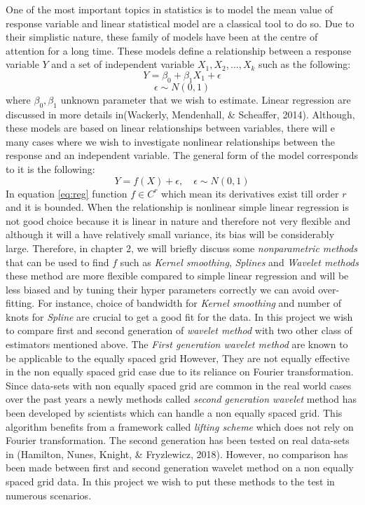 \documentclass[12pt,twoside, a4paper]{reedthesis}
\begin{document}
One of the most important topics in statistics is to model the mean value of response variable and linear statistical model are a classical tool to do so. Due to their simplistic nature, these family of models have been at the centre of attention for a long time. These models define a relationship between a response variable \(Y\) and a set of independent variable \(X_1,X_2,\dots,X_k\) such as the following:
\[Y=\beta_0+\beta_1X_1+\epsilon\]
\[\epsilon\sim N(0,1)\]
where \(\beta_0,\beta_1\) unknown parameter that we wish to estimate. Linear regression are discussed in more details in(Wackerly, Mendenhall, \& Scheaffer, 2014). Although, these models are based on linear relationships between variables, there will e many cases where we wish to investigate nonlinear relationships between the response and an independent variable. The general form of the model corresponds to it is the following:
\begin{equation}
Y=f(X)+\epsilon,\quad \epsilon\sim N(0,1)
\label{eq:reg}
\end{equation}
In equation \eqref{eq:reg} function \(f \in C^r\) which mean its derivatives exist till order \(r\) and it is bounded. When the relationship is nonlinear simple linear regression is not good choice because it is linear in nature and therefore not very flexible and although it will a have relatively small variance, its bias will be considerably large. Therefore, in chapter 2, we will briefly discuss some \emph{nonparametric methods} that can be used to find \(f\) such as \emph{Kernel smoothing}, \emph{Splines} and \emph{Wavelet methods} these method are more flexible compared to simple linear regression and will be less biased and by tuning their hyper parameters correctly we can avoid over-fitting. For instance, choice of bandwidth for \emph{Kernel smoothing} and number of knots for \emph{Spline} are crucial to get a good fit for the data. In this project we wish to compare first and second generation of \emph{wavelet method} with two other class of estimators mentioned above. The \emph{First generation wavelet method} are known to be applicable to the equally spaced grid However, They are not equally effective in the non equally spaced grid case due to its reliance on Fourier transformation. Since data-sets with non equally spaced grid are common in the real world cases over the past years a newly methods called \emph{second generation wavelet} method has been developed by scientists which can handle a non equally spaced grid. This algorithm benefits from a framework called \emph{lifting scheme} which does not rely on Fourier transformation. The second generation has been tested on real data-sets in (Hamilton, Nunes, Knight, \& Fryzlewicz, 2018). However, no comparison has been made between first and second generation wavelet method on a non equally spaced grid data. In this project we wish to put these methods to the test in numerous scenarios.
\end{document}

